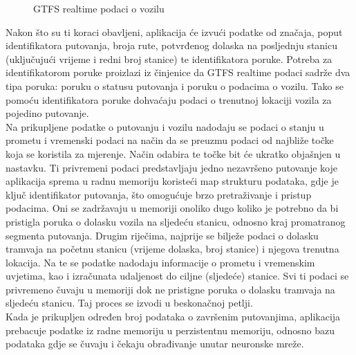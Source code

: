 \documentclass[seminarskirad]{fer}
\begin{document}
\begin{figure}[h!]
\begin{minipage}{0.48\textwidth}
		\caption{GTFS realtime podaci o vozilu}
		\label{fig:code2}
	\end{minipage}
\end{figure}

Nakon što su ti koraci obavljeni, aplikacija će izvući podatke od značaja, poput identifikatora putovanja, broja rute, potvrđenog dolaska na posljednju stanicu (uključujući vrijeme i redni broj stanice) te identifikatora poruke. Potreba za identifikatorom poruke proizlazi iz činjenice da GTFS realtime podaci sadrže dva tipa poruka: poruku o statusu putovanja i poruku o podacima o vozilu. Tako se pomoću identifikatora poruke dohvaćaju podaci o trenutnoj lokaciji vozila za pojedino putovanje.\\
Na prikupljene podatke o putovanju i vozilu nadodaju se podaci o stanju u prometu i vremenski podaci na način da se preuzmu podaci od najbliže točke koja se koristila za mjerenje. Način odabira te točke bit će ukratko objašnjen u nastavku. Ti privremeni podaci predstavljaju jedno nezavršeno putovanje koje aplikacija sprema u radnu memoriju koristeći map strukturu podataka, gdje je ključ identifikator putovanja, što omogućuje brzo pretraživanje i pristup podacima. Oni se zadržavaju u memoriji onoliko dugo koliko je potrebno da bi pristigla poruka o dolasku vozila na sljedeću stanicu, odnosno kraj promatranog segmenta putovanja. Drugim riječima, najprije se bilježe podaci o dolasku tramvaja na početnu stanicu (vrijeme dolaska, broj stanice) i njegova trenutna lokacija. Na te se podatke nadodaju informacije o prometu i vremenskim uvjetima, kao i izračunata udaljenost do ciljne (sljedeće) stanice. Svi ti podaci se privremeno čuvaju u memoriji dok ne pristigne poruka o dolasku tramvaja na sljedeću stanicu. Taj proces se izvodi u beskonačnoj petlji.\\
Kada je prikupljen određen broj podataka o završenim putovanjima, aplikacija prebacuje podatke iz radne memoriju u perzistentnu memoriju, odnosno bazu podataka gdje se čuvaju i čekaju obrađivanje unutar neuronske mreže.\\
\end{document}
